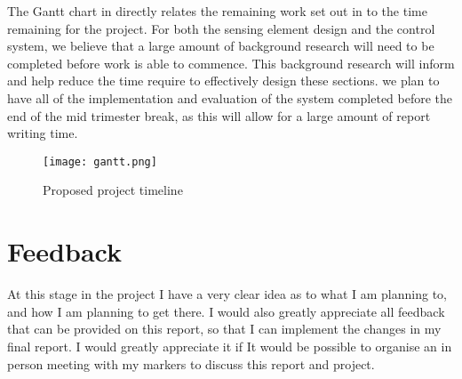 The Gantt chart in  directly relates the remaining work set out in  to the time remaining for the project. For both the sensing element design and the control system, we believe that a large amount of background research will need to be completed before work is able to commence. This background research will inform and help reduce the time require to effectively design these sections. we plan to have all of the implementation and evaluation of the system completed before the end of the mid trimester break, as this will allow for a large amount of report writing time.

\begin{figure}[H]
    \texttt{[image: gantt.png]}
    \caption{Proposed project timeline}
    \label{F:gantt}
\end{figure}


\section*{Feedback}\label{S:feedback} 

At this stage in the project I have a very clear idea as to what I am planning to, and how I am planning to get there. I would also greatly appreciate all feedback that can be provided on this report, so that I can implement the changes in my final report. I would greatly appreciate it if It would be possible to organise an in person meeting with my markers to discuss this report and project. 